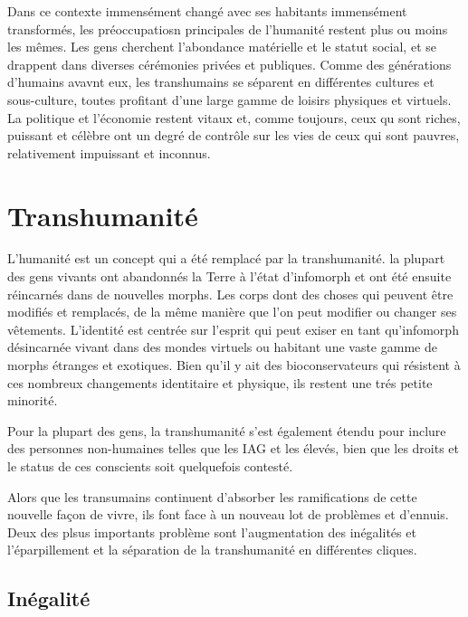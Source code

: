 Dans ce contexte immensément changé avec ses habitants immensément transformés, les préoccupatiosn principales de l'humanité restent plus ou moins les mêmes. Les gens cherchent l'abondance matérielle et le statut social, et se drappent dans diverses cérémonies privées et publiques. Comme des générations d'humains avavnt eux, les transhumains se séparent en différentes cultures et sous-culture, toutes profitant d'une large gamme de loisirs physiques et virtuels. La politique et l'économie restent vitaux et, comme toujours, ceux qu sont riches, puissant et célèbre ont un degré de contrôle sur les vies de ceux qui sont pauvres, relativement impuissant et inconnus. 

\section{Transhumanité} \label{sec:transhumanity} 

L'humanité est un concept qui a été remplacé par la transhumanité. la plupart des gens vivants ont abandonnés la Terre à l'état d'infomorph et ont été ensuite réincarnés dans de nouvelles morphs. Les corps dont des choses qui peuvent être modifiés et remplacés, de la même manière que l'on peut modifier ou changer ses vêtements. L'identité est centrée sur l'esprit qui peut exiser en tant qu'infomorph désincarnée vivant dans des mondes virtuels ou habitant une vaste gamme de morphs étranges et exotiques. Bien qu'il y ait des bioconservateurs qui résistent à ces nombreux changements identitaire et physique, ils restent une trés petite minorité. 

Pour la plupart des gens, la transhumanité s'est également étendu pour inclure des personnes non-humaines telles que les IAG et les élevés, bien que les droits et le status de ces conscients soit quelquefois contesté. 

Alors que les transumains continuent d'absorber les ramifications de cette nouvelle façon de vivre, ils font face à un nouveau lot de problèmes et d'ennuis. Deux des plsus importants problème sont l'augmentation des inégalités et l'éparpillement et la séparation de la transhumanité en différentes cliques. 

\subsection{Inégalité} \label{sec:inequality} 

